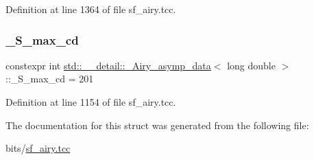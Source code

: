 Definition at line 1364 of file sf\+\_\+airy.\+tcc.

\mbox{\label{structstd_1_1____detail_1_1__Airy__asymp__data_3_01long_01double_01_4_a6a21ac69ffc53d33ebc346981bc52b9a}} 
\subsubsection{\texorpdfstring{\+\_\+\+S\+\_\+max\+\_\+cd}{\_S\_max\_cd}}
{\footnotesize\ttfamily constexpr int \hyperlink{structstd_1_1____detail_1_1__Airy__asymp__data}{std\+::\+\_\+\+\_\+detail\+::\+\_\+\+Airy\+\_\+asymp\+\_\+data}$<$ long double $>$\+::\+\_\+\+S\+\_\+max\+\_\+cd = 201\hspace{0.3cm}{\ttfamily [static]}}



Definition at line 1154 of file sf\+\_\+airy.\+tcc.



The documentation for this struct was generated from the following file\+:\begin{DoxyCompactItemize}
\item 
bits/\hyperlink{sf__airy_8tcc}{sf\+\_\+airy.\+tcc}\end{DoxyCompactItemize}
